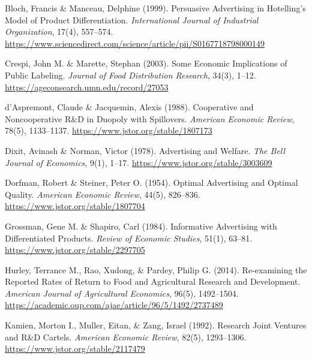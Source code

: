 \documentclass[sn-mathphys-ay]{sn-jnl} %
\theoremstyle{remark}
\begin{document}
\begin{thebibliography}{}
Bloch, Francis \& Manceau, Delphine (1999).
\newblock Persuasive Advertising in Hotelling's Model of Product Differentiation.
\newblock \emph{International Journal of Industrial Organization}, 17(4), 557--574.
\newblock \url{https://www.sciencedirect.com/science/article/pii/S0167718798000149}

Crespi, John M. \& Marette, Stephan (2003).
\newblock Some Economic Implications of Public Labeling.
\newblock \emph{Journal of Food Distribution Research}, 34(3), 1--12.
\newblock \url{https://ageconsearch.umn.edu/record/27053}

d'Aspremont, Claude \& Jacquemin, Alexis (1988).
\newblock Cooperative and Noncooperative R\&D in Duopoly with Spillovers.
\newblock \emph{American Economic Review}, 78(5), 1133--1137.
\newblock \url{https://www.jstor.org/stable/1807173}

Dixit, Avinash \& Norman, Victor (1978).
\newblock Advertising and Welfare.
\newblock \emph{The Bell Journal of Economics}, 9(1), 1--17.
\newblock \url{https://www.jstor.org/stable/3003609}

Dorfman, Robert \& Steiner, Peter O. (1954).
\newblock Optimal Advertising and Optimal Quality.
\newblock \emph{American Economic Review}, 44(5), 826--836.
\newblock \url{https://www.jstor.org/stable/1807704}

Grossman, Gene M. \& Shapiro, Carl (1984).
\newblock Informative Advertising with Differentiated Products.
\newblock \emph{Review of Economic Studies}, 51(1), 63--81.
\newblock \url{https://www.jstor.org/stable/2297705}

Hurley, Terrance M., Rao, Xudong, \& Pardey, Philip G. (2014).
\newblock Re-examining the Reported Rates of Return to Food and Agricultural Research and Development.
\newblock \emph{American Journal of Agricultural Economics}, 96(5), 1492--1504.
\newblock \url{https://academic.oup.com/ajae/article/96/5/1492/2737489}

Kamien, Morton I., Muller, Eitan, \& Zang, Israel (1992).
\newblock Research Joint Ventures and R\&D Cartels.
\newblock \emph{American Economic Review}, 82(5), 1293--1306.
\newblock \url{https://www.jstor.org/stable/2117479}


\end{thebibliography}
\end{document}
